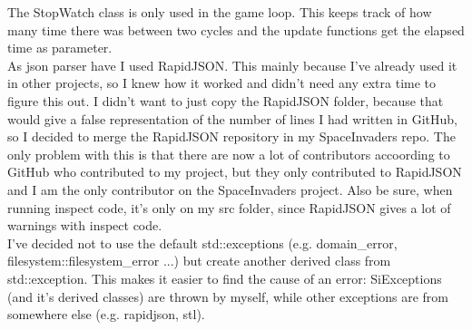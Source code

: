 \documentclass{article}
\begin{document}
    The StopWatch class is only used in the game loop. This keeps track of how many time there was between two cycles and the update functions get the elapsed time as parameter. \\
    As json parser have I used RapidJSON. This mainly because I've already used it in other projects, so I knew how it worked and didn't need any extra time to figure this out. I didn't want to just copy the RapidJSON folder, because that would give a false representation of the number of lines I had written in GitHub, so I decided to merge the RapidJSON repository in my SpaceInvaders repo. The only problem with this is that there are now a lot of contributors accoording to GitHub who contributed to my project, but they only contributed to RapidJSON and I am the only contributor on the SpaceInvaders project. Also be sure, when running inspect code, it's only on my src folder, since RapidJSON gives a lot of warnings with inspect code.\\
    I've decided not to use the default std::exceptions (e.g. domain\_error, filesystem::filesystem\_error ...) but create another derived class from std::exception. This makes it easier to find the cause of an error: SiExceptions (and it's derived classes) are thrown by myself, while other exceptions are from somewhere else (e.g. rapidjson, stl).
\end{document}
